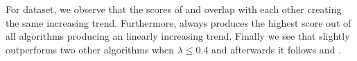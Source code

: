 For  dataset, we observe that the scores of \algdenseg and \algdensec overlap with each other creating the same increasing trend. Furthermore, \alglpstc always produces the highest score out of all algorithms producing an linearly increasing trend.
Finally we see that \alggreedyfastest slightly outperforms two other algorithms when $\lambda \leq 0.4$ and afterwards it follows \algdenseg and \algdensec.
 





\fi